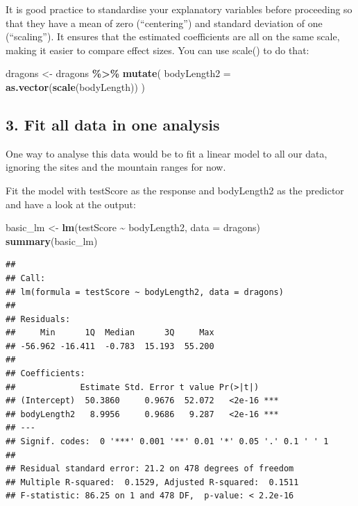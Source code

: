 \documentclass[
]{article}
\newenvironment{Shaded}{\begin{snugshade}}{\end{snugshade}}
\newcommand{\AttributeTok}[1]{\textcolor[rgb]{0.13,0.29,0.53}{#1}}
\newcommand{\FunctionTok}[1]{\textcolor[rgb]{0.13,0.29,0.53}{\textbf{#1}}}
\newcommand{\NormalTok}[1]{#1}
\newcommand{\OtherTok}[1]{\textcolor[rgb]{0.56,0.35,0.01}{#1}}
\newcommand{\SpecialCharTok}[1]{\textcolor[rgb]{0.81,0.36,0.00}{\textbf{#1}}}
\begin{document}
It is good practice to standardise your explanatory variables before
proceeding so that they have a mean of zero (``centering'') and standard
deviation of one (``scaling''). It ensures that the estimated
coefficients are all on the same scale, making it easier to compare
effect sizes. You can use scale() to do that:

\begin{Shaded}
\begin{Highlighting}[]
\NormalTok{dragons }\OtherTok{\textless{}{-}}\NormalTok{ dragons }\SpecialCharTok{\%\textgreater{}\%} 
  \FunctionTok{mutate}\NormalTok{(}
    \AttributeTok{bodyLength2 =} \FunctionTok{as.vector}\NormalTok{(}\FunctionTok{scale}\NormalTok{(bodyLength))}
\NormalTok{  )}
\end{Highlighting}
\end{Shaded}

\subsection{3. Fit all data in one
analysis}\label{fit-all-data-in-one-analysis}

One way to analyse this data would be to fit a linear model to all our
data, ignoring the sites and the mountain ranges for now.

Fit the model with testScore as the response and bodyLength2 as the
predictor and have a look at the output:

\begin{Shaded}
\begin{Highlighting}[]
\NormalTok{basic\_lm }\OtherTok{\textless{}{-}} \FunctionTok{lm}\NormalTok{(testScore }\SpecialCharTok{\textasciitilde{}}\NormalTok{ bodyLength2, }\AttributeTok{data =}\NormalTok{ dragons)}
\FunctionTok{summary}\NormalTok{(basic\_lm)}
\end{Highlighting}
\end{Shaded}

\begin{verbatim}
## 
## Call:
## lm(formula = testScore ~ bodyLength2, data = dragons)
## 
## Residuals:
##     Min      1Q  Median      3Q     Max 
## -56.962 -16.411  -0.783  15.193  55.200 
## 
## Coefficients:
##             Estimate Std. Error t value Pr(>|t|)    
## (Intercept)  50.3860     0.9676  52.072   <2e-16 ***
## bodyLength2   8.9956     0.9686   9.287   <2e-16 ***
## ---
## Signif. codes:  0 '***' 0.001 '**' 0.01 '*' 0.05 '.' 0.1 ' ' 1
## 
## Residual standard error: 21.2 on 478 degrees of freedom
## Multiple R-squared:  0.1529, Adjusted R-squared:  0.1511 
## F-statistic: 86.25 on 1 and 478 DF,  p-value: < 2.2e-16
\end{verbatim}
\end{document}
